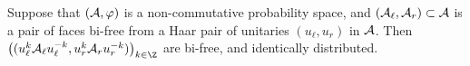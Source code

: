 \begin{theorem}
	\label{thm:bihaarconj}
	Suppose that $(\mathcal{A}, \varphi)$ is a non-commutative probability space, and $(\mathcal{A}_\ell, \mathcal{A}_r) \subset \mathcal{A}$ is a pair of faces bi-free from a Haar pair of unitaries $(u_\ell, u_r)$ in $\mathcal{A}$.
	Then $\paren{(u_\ell^k\A_\ell u_\ell^{-k}, u_r^k \A_r u_r^{-k})}_{k\in\Z}$ are bi-free, and identically distributed.
\end{theorem}

% 
